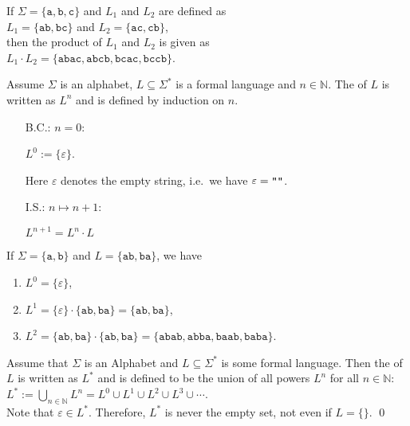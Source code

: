 \exampleEng
If $\Sigma = \{ \texttt{a}, \texttt{b}, \texttt{c} \}$ and $L_1$ and $L_2$ are defined as
\\[0.2cm]
\hspace*{1.3cm}
$L_1 = \{ \texttt{ab}, \texttt{bc} \}$ \quad and \quad
$L_2 = \{ \texttt{ac}, \texttt{cb} \}$,
\\[0.2cm]
then the product of $L_1$ and $L_2$ is given as
\\[0.2cm]
\hspace*{1.3cm}
$L_1 \cdot L_2 = \{ \texttt{abac}, \texttt{abcb}, \texttt{bcac}, \texttt{bccb} \}$.  \eox

\begin{Definition} 
Assume $\Sigma$ is an  alphabet, $L \subseteq \Sigma^*$ is a formal language and $n\in\mathbb{N}$.
The   of $L$  is written as  $L^n$  and is
defined by induction on  $n$.  
\begin{enumerate}
\item[B.C.:] $n = 0$: 

      $L^0 := \{ \varepsilon \}$.

      Here $\varepsilon$ denotes the empty string, i.e.~we have $\varepsilon = \texttt{\symbol{34}\symbol{34}}$.

\item[I.S.:] $n \mapsto n + 1$:

      $L^{n+1} = L^n \cdot L$  \eox
\end{enumerate}
\end{Definition}

\exampleEng
If $\Sigma = \{ \texttt{a}, \texttt{b} \}$ and $L = \{ \texttt{ab}, \texttt{ba} \}$, we have
\begin{enumerate}
\item $L^0 = \{ \varepsilon \}$,
\item $L^1 = \{ \varepsilon \} \cdot \{ \texttt{ab}, \texttt{ba} \} = \{ \texttt{ab}, \texttt{ba} \}$,
\item $L^2 = \{ \texttt{ab}, \texttt{ba} \} \cdot \{ \texttt{ab}, \texttt{ba} \} = 
             \{ \texttt{abab}, \texttt{abba}, \texttt{baab}, \texttt{baba} \}$.  \eox
\end{enumerate}

\begin{Definition}
  Assume that $\Sigma$ is an Alphabet and $L \subseteq \Sigma^*$ is some formal language. Then the
    of $L$ is written as $L^*$  and is defined to be
  the union of all powers $L^n$ for all $n \in \mathbb{N}$: 
  \\[0.2cm]
  \hspace*{1.3cm}
  $L^* := \bigcup\limits_{n \in \mathbb{N}} L^n = L^0 \cup L^1 \cup L^2 \cup L^3 \cup \cdots$.
  \\[0.2cm]
  Note that $\varepsilon \in L^*$.  Therefore, $L^*$ is never the empty set, not even if $L = \{\}$.
  \qed  
\end{Definition}

